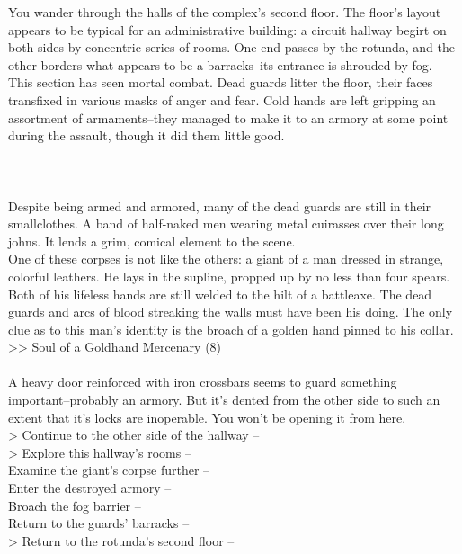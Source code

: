 You wander through the halls of the complex’s second floor. The floor's layout appears to be typical for an administrative building: a circuit hallway begirt on both sides by concentric series of rooms. One end passes by the rotunda, and the other borders what appears to be a barracks--its entrance is shrouded by fog.\\

This section has seen mortal combat. Dead guards litter the floor, their faces transfixed in various masks of anger and fear. Cold hands are left gripping an assortment of armaments--they managed to make it to an armory at some point during the assault, though it did them little good.\\
\\
\\
\\

Despite being armed and armored, many of the dead guards are still in their smallclothes. A band of half-naked men wearing metal cuirasses over their long johns. It lends a grim, comical element to the scene.\\

One of these corpses is not like the others: a giant of a man dressed in strange, colorful leathers. He lays in the supline, propped up by no less than four spears. Both of his lifeless hands are still welded to the hilt of a battleaxe. The dead guards and arcs of blood streaking the walls must have been his doing. The only clue as to this man's identity is the broach of a golden hand pinned to his collar.\\
>> Soul of a Goldhand Mercenary (8)\\
\\

A heavy door reinforced with iron crossbars seems to guard something important--probably an armory. But it's dented from the other side to such an extent that it's locks are inoperable. You won't be opening it from here.\\

> Continue to the other side of the hallway -- \\
> Explore this hallway's rooms -- \\
 Examine the giant's corpse further -- \\
 Enter the destroyed armory -- \\
 Broach the fog barrier -- \\
 Return to the guards' barracks -- \\
> Return to the rotunda’s second floor -- 